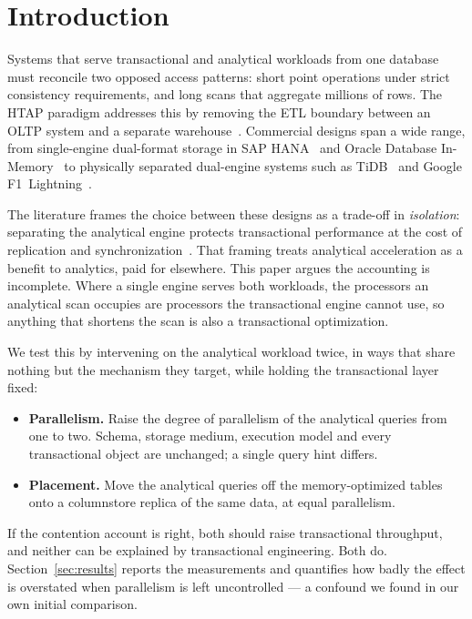 \documentclass[conference,a4paper]{IEEEtran}
\begin{document}
\section{Introduction}

Systems that serve transactional and analytical workloads from one database
must reconcile two opposed access patterns: short point operations under strict
consistency requirements, and long scans that aggregate millions of rows. The
HTAP paradigm addresses this by removing the ETL boundary between an OLTP
system and a separate warehouse~\cite{ozcan2017htap}. Commercial designs span a
wide range, from single-engine dual-format storage in SAP HANA~\cite{farber2012hana}
and Oracle Database In-Memory~\cite{lahiri2015oracle} to physically separated
dual-engine systems such as TiDB~\cite{huang2020tidb} and Google
F1~Lightning~\cite{yang2020f1}.

The literature frames the choice between these designs as a trade-off in
\emph{isolation}: separating the analytical engine protects transactional
performance at the cost of replication and
synchronization~\cite{zhang2024htap, zhao2023benchmarking}. That framing treats
analytical acceleration as a benefit to analytics, paid for elsewhere. This
paper argues the accounting is incomplete. Where a single engine serves both
workloads, the processors an analytical scan occupies are processors the
transactional engine cannot use, so anything that shortens the scan is also a
transactional optimization.

We test this by intervening on the analytical workload twice, in ways that
share nothing but the mechanism they target, while holding the transactional
layer fixed:

\begin{itemize}
\item \textbf{Parallelism.} Raise the degree of parallelism of the analytical
queries from one to two. Schema, storage medium, execution model and every
transactional object are unchanged; a single query hint differs.
\item \textbf{Placement.} Move the analytical queries off the memory-optimized
tables onto a columnstore replica of the same data, at equal parallelism.
\end{itemize}

If the contention account is right, both should raise transactional throughput,
and neither can be explained by transactional engineering. Both do.
Section~\ref{sec:results} reports the measurements and quantifies how badly the
effect is overstated when parallelism is left uncontrolled --- a confound we
found in our own initial comparison.
\end{document}
